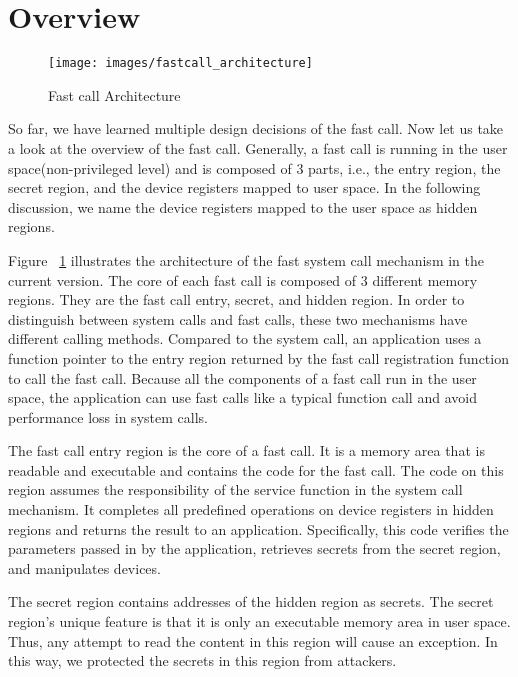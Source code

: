 \section{Overview}
\begin{figure}[tbp]
  \centering
  \texttt{[image: images/fastcall\_architecture]}
  \caption[Short description]{Fast call Architecture}
  \label{fig:fastcall_architecture}
\end{figure}



So far, we have learned multiple design decisions of the fast call. 
Now let us take a look at the overview of the fast call. Generally, 
a fast call is running in the user space(non-privileged level) and is 
composed of 3 parts, i.e., the entry region, the secret region, and the 
device registers mapped to user space. 	In the following discussion, 
we name the device registers mapped to the user space as hidden regions.

Figure ~\ref{fig:fastcall_architecture} illustrates the 
architecture of the fast system call mechanism in the current 
version. The core of each fast call is composed of 3 different 
memory regions. They are the fast call entry, secret, and hidden region. 
In order to distinguish between system calls and fast calls, these two 
mechanisms have different calling methods. Compared to the system call, 
an application uses a function pointer to the entry region returned by 
the fast call registration function to call the fast call. Because all 
the components of a fast call run in the user space, the application can 
use fast calls like a typical function call and avoid performance 
loss in system calls.

The fast call entry region is the core of a fast call. 
It is a memory area that is readable and executable and 
contains the code for the fast call. The code on this 
region assumes the responsibility of the service function 
in the system call mechanism. It completes all predefined 
operations on device registers in hidden regions and returns 
the result to an application. Specifically, this code verifies 
the parameters passed in by the application, retrieves secrets 
from the secret region, and manipulates devices. 

The secret region contains addresses of the hidden region as secrets. 
The secret region's unique feature is that it is only an executable memory 
area in user space. Thus, any attempt to read the content in this region 
will cause an exception. In this way, we protected the secrets in this 
region from attackers.


